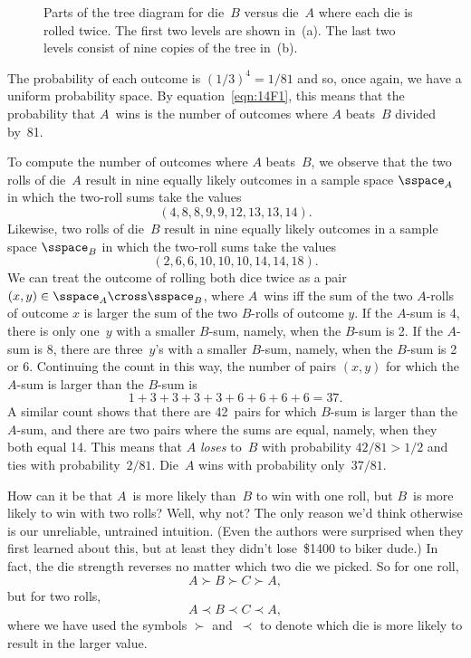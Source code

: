 \begin{figure}


\caption{Parts of the tree diagram for die~$B$ versus die~$A$ where
  each die is rolled twice.  The first two levels are shown in~(a).
  The last two levels consist of nine copies of the tree in~(b).}

\label{fig:14A11}

\end{figure}

The probability of each outcome is $(1/3)^4 = 1/81$ and so, once
again, we have a uniform probability space.  By
equation~\eqref{eqn:14F1}, this means that the probability that
$A$~wins is the number of outcomes where $A$ beats~$B$ divided by~81.

To compute the number of outcomes where $A$ beats~$B$, we observe that
the two rolls of die~$A$ result in nine equally likely 
outcomes in a sample space $\sspace_A$ in which the
two-roll sums take the values
\[
    (4, 8, 8, 9, 9, 12, 13, 13, 14).
\]
Likewise, two rolls of die~$B$ result in nine equally likely outcomes
in a sample space $\sspace_B$ in which the
two-roll sums take the values
\[
(2, 6, 6, 10, 10, 10, 14, 14, 18).
\]
We can treat the outcome of rolling both dice twice as a pair $(x,y) \in
\sspace_A \cross \sspace_B$, where $A$~wins iff the sum of the two
$A$-rolls of outcome $x$ is larger the sum of the two $B$-rolls of
outcome $y$.  If the $A$-sum is 4, there is only one~$y$ with a
smaller $B$-sum, namely, when the $B$-sum is 2.  If the $A$-sum is 8,
there are three~$y$'s with a smaller $B$-sum, namely, when the $B$-sum
is 2 or 6.  Continuing the count in this way, the number of pairs
$(x,y)$ for which the $A$-sum is larger than the $B$-sum is
\begin{equation*}
    1 + 3 + 3 + 3 + 3 + 6 + 6 + 6 + 6 = 37.
\end{equation*}
A similar count shows that there are 42~pairs for which $B$-sum is
larger than the $A$-sum, and there are two pairs where the sums are
equal, namely, when they both equal 14.  This means that $A$
\emph{loses} to~$B$ with probability $42/81 > 1/2$ and ties with
probability~$2/81$.  Die~$A$ wins with probability only~$37/81$.

How can it be that $A$~is more likely than~$B$ to win with one roll,
but $B$~is more likely to win with two rolls?  Well, why not?  The
only reason we'd think otherwise is our unreliable, untrained
intuition.  (Even the authors were surprised when they first learned
about this, but at least they didn't lose~\$1400 to biker dude.)  In
fact, the die strength reverses no matter which two die we picked.  So
for one roll,
\begin{equation*}
    A \succ B \succ C \succ A,
\end{equation*}
but for two rolls,
\begin{equation*}
    A \prec B \prec C \prec A,
\end{equation*}
where we have used the symbols $\succ$ and~$\prec$ to denote which die
is more likely to result in the larger value.

